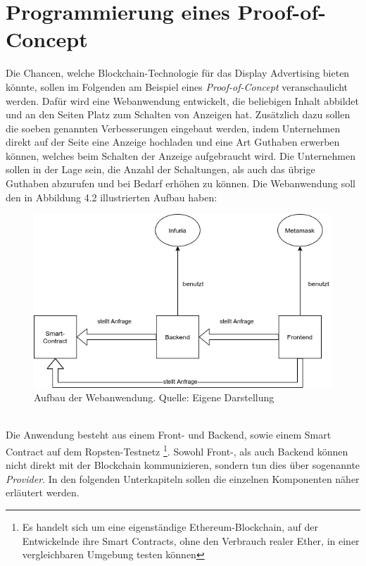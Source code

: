 \section{Programmierung eines Proof-of-Concept}
Die Chancen, welche Blockchain-Technologie für das Display Advertising bieten könnte, sollen im Folgenden am Beispiel eines \emph{Proof-of-Concept} veranschaulicht werden. 
Dafür wird eine Webanwendung entwickelt, die beliebigen Inhalt abbildet und an den Seiten Platz zum Schalten von Anzeigen hat. 
Zusätzlich dazu sollen die soeben genannten Verbesserungen eingebaut werden, indem Unternehmen direkt auf der Seite eine Anzeige hochladen und eine Art Guthaben erwerben können, welches beim Schalten der Anzeige aufgebraucht wird. Die Unternehmen sollen in der Lage sein, die Anzahl der Schaltungen, als auch das übrige Guthaben abzurufen und bei Bedarf erhöhen zu können. Die Webanwendung soll den in Abbildung 4.2 illustrierten Aufbau haben:
\begin{figure}[htpb]
	\centering
	\includegraphics[width=\textwidth]{images/aufbau_PoC.png}
	\caption{Aufbau der Webanwendung.
	Quelle: Eigene Darstellung}
	\label{6braun:fig:aufbau_poc}
\end{figure}\\
Die Anwendung besteht aus einem Front- und Backend, sowie einem Smart Contract auf dem Ropsten-Testnetz \footnote{Es handelt sich um eine eigenständige Ethereum-Blockchain, auf der Entwickelnde ihre Smart Contracts, ohne den Verbrauch realer Ether, in einer vergleichbaren Umgebung testen können}. Sowohl Front-, als auch Backend können nicht direkt mit der Blockchain kommunizieren, sondern tun dies über sogenannte \emph{Provider}. In den folgenden Unterkapiteln sollen die einzelnen Komponenten näher erläutert werden.

